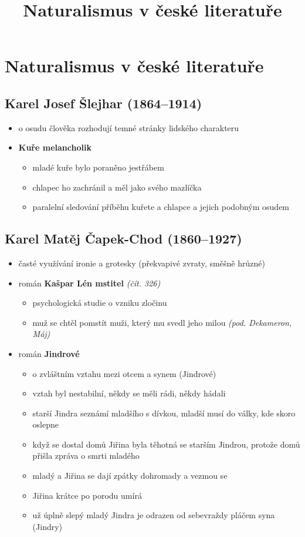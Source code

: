 \title{Naturalismus v české literatuře}

\section{Naturalismus v české literatuře}
\subsection{Karel Josef Šlejhar (1864--1914)}
\begin{itemize}
\item o osudu člověka rozhodují temné stránky lidského charakteru
\item \textbf{Kuře melancholik}
	\begin{itemize}
	\item mladé kuře bylo poraněno jestřábem
	\item chlapec ho zachránil a měl jako svého mazlíčka
	\item paralelní sledování příběhu kuřete a chlapce a jejich podobným osudem
	\end{itemize}
\end{itemize}

\subsection{Karel Matěj Čapek-Chod (1860--1927)}
\begin{itemize}
\item časté využívání ironie a grotesky (překvapivé zvraty, směšně hrůzné)
\item román \textbf{Kašpar Lén mstitel} \textit{(čít. 326)}
	\begin{itemize}
	\item psychologická studie o vzniku zločinu
	\item muž se chtěl pomstít muži, který mu svedl jeho milou \textit{(pod. Dekameron, Máj)}
	\end{itemize}

\item román \textbf{Jindrové}
	\begin{itemize}
	\item o zvláštním vztahu mezi otcem a synem (Jindrové)
	\item vztah byl nestabilní, někdy se měli rádi, někdy hádali
	\item starší Jindra seznámí mladšího s dívkou, mladší musí do války, kde skoro oslepne
	\item když se dostal domů Jiřina byla těhotná se starším Jindrou, protože domů přišla zpráva o smrti mladého 
	\item mladý a Jiřina se dají zpátky dohromady a vezmou se
	\item Jiřina krátce po porodu umírá
	\item už úplně slepý mladý Jindra je odrazen od sebevraždy pláčem syna (Jindry)
	\end{itemize}
\end{itemize}


